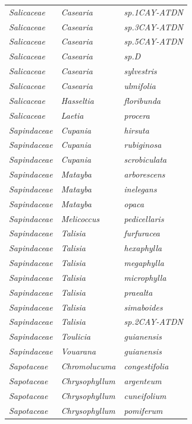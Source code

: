 \documentclass[fleqn,10pt]{ArtEcoFoG} %
\begin{document}
\begin{table}[t]
\begin{tabular}{lll}
\em{Salicaceae} & \em{Casearia} & \em{sp.1CAY-ATDN}\\
\em{Salicaceae} & \em{Casearia} & \em{sp.3CAY-ATDN}\\
\addlinespace
\em{Salicaceae} & \em{Casearia} & \em{sp.5CAY-ATDN}\\
\em{Salicaceae} & \em{Casearia} & \em{sp.D}\\
\em{Salicaceae} & \em{Casearia} & \em{sylvestris}\\
\em{Salicaceae} & \em{Casearia} & \em{ulmifolia}\\
\em{Salicaceae} & \em{Hasseltia} & \em{floribunda}\\
\addlinespace
\em{Salicaceae} & \em{Laetia} & \em{procera}\\
\em{Sapindaceae} & \em{Cupania} & \em{hirsuta}\\
\em{Sapindaceae} & \em{Cupania} & \em{rubiginosa}\\
\em{Sapindaceae} & \em{Cupania} & \em{scrobiculata}\\
\em{Sapindaceae} & \em{Matayba} & \em{arborescens}\\
\addlinespace
\em{Sapindaceae} & \em{Matayba} & \em{inelegans}\\
\em{Sapindaceae} & \em{Matayba} & \em{opaca}\\
\em{Sapindaceae} & \em{Melicoccus} & \em{pedicellaris}\\
\em{Sapindaceae} & \em{Talisia} & \em{furfuracea}\\
\em{Sapindaceae} & \em{Talisia} & \em{hexaphylla}\\
\addlinespace
\em{Sapindaceae} & \em{Talisia} & \em{megaphylla}\\
\em{Sapindaceae} & \em{Talisia} & \em{microphylla}\\
\em{Sapindaceae} & \em{Talisia} & \em{praealta}\\
\em{Sapindaceae} & \em{Talisia} & \em{simaboides}\\
\em{Sapindaceae} & \em{Talisia} & \em{sp.2CAY-ATDN}\\
\addlinespace
\em{Sapindaceae} & \em{Toulicia} & \em{guianensis}\\
\em{Sapindaceae} & \em{Vouarana} & \em{guianensis}\\
\em{Sapotaceae} & \em{Chromolucuma} & \em{congestifolia}\\
\em{Sapotaceae} & \em{Chrysophyllum} & \em{argenteum}\\
\em{Sapotaceae} & \em{Chrysophyllum} & \em{cuneifolium}\\
\addlinespace
\em{Sapotaceae} & \em{Chrysophyllum} & \em{pomiferum}\\

\end{tabular}
\end{table}
\end{document}
